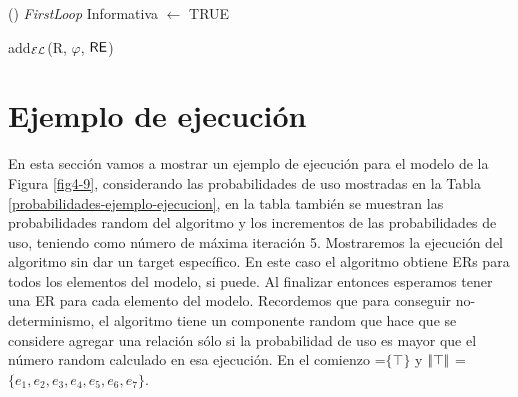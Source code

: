 \begin{megaalgorithm}[H]

\dontprintsemicolon
{}
\Output{\footnotesize $\RE$}
\If()
{\em FirstLoop}{
Informativa $\leftarrow$ TRUE }
\\
\caption{add$_\mathcal{EL}$(R, $\varphi$, $\RE$)} \label{algo:bisim-add-el-over}
\end{megaalgorithm}


\section{Ejemplo de ejecuci\'on}
\label{sec:ejemplo_ejecucion}

En esta secci\'on vamos a mostrar un ejemplo de ejecuci\'on para el modelo de la Figura \ref{fig4-9}, considerando las probabilidades de uso mostradas en la Tabla \ref{probabilidades-ejemplo-ejecucion}, en la tabla tambi\'en se muestran las probabilidades random del algoritmo y los incrementos de las probabilidades de uso, teniendo como n\'umero de m\'axima iteraci\'on 5. Mostraremos la ejecuci\'on del algoritmo sin dar un target espec\'ifico. En este caso el algoritmo obtiene ERs para todos los elementos del modelo, si puede. Al finalizar entonces esperamos tener una ER para cada elemento del modelo. Recordemos que para conseguir no-determinismo, el algoritmo tiene un componente random que hace que se considere agregar una relaci\'on s\'olo si la probabilidad de uso es mayor que el n\'umero random calculado en esa ejecuci\'on. 
En el comienzo \RE=$\{\top\}$ y $|\!|\top|\!|$ = $\{e_1, e_2, e_3, e_4, e_5, e_6, e_7\}$.\\

